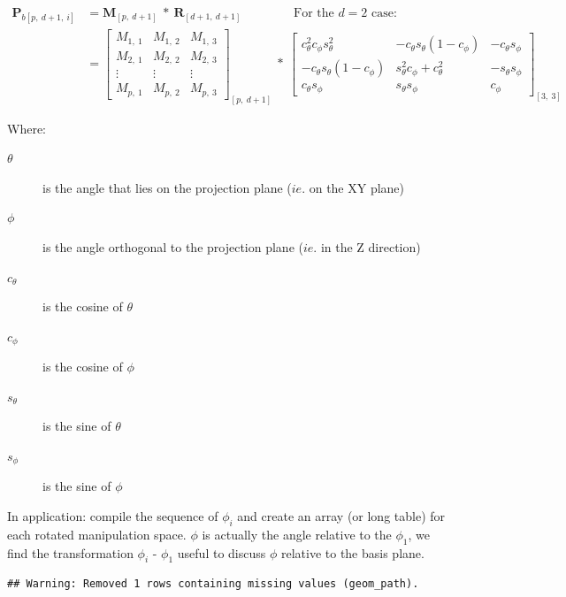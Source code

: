 \documentclass{monashthesis}
\begin{document}
\begin{align*}
  \textbf{P}_{b[p,~d+1,~i]}
  &= \textbf{M}_{[p,~d+1]} ~*~ \textbf{R}_{[d+1,~d+1]} 
    ~~~~~~~~~~~~~~~~~~~\text{For the $d=2$ case:} \\
  &= \begin{bmatrix}
    M_{1,~1} & M_{1,~2} & M_{1,~3} \\
    M_{2,~1} & M_{2,~2} & M_{2,~3} \\
    \vdots   & \vdots   & \vdots   \\
    M_{p,~1} & M_{p,~2} & M_{p,~3}
  \end{bmatrix}_{[p,~d+1]}
    ~*~
  \begin{bmatrix}
    c_\theta^2 c_\phi s_\theta^2 &
    -c_\theta s_\theta (1 - c_\phi) &
    -c_\theta s_\phi \\
    -c_\theta s_\theta (1 - c_\phi) &
    s_\theta^2 c_\phi + c_\theta^2 &
    -s_\theta s_\phi \\
    c_\theta s_\phi &
    s_\theta s_\phi &
    c_\phi
  \end{bmatrix}_{[3,~3]}
\end{align*}

Where:

\begin{description}
  \item[$\theta$] is the angle that lies on the projection plane ($ie.$ on the XY plane)
  \item[$\phi$] is the angle orthogonal to the projection plane ($ie.$ in the Z direction)
  \item[$c_\theta$] is the cosine of $\theta$
  \item[$c_\phi$]   is the cosine of $\phi$
  \item[$s_\theta$] is the sine of   $\theta$
  \item[$s_\phi$]   is the sine of   $\phi$
\end{description}

In application: compile the sequence of \(\phi_i\) and create an array (or long table) for each rotated manipulation space. \(\phi\) is actually the angle relative to the \(\phi_1\), we find the transformation \(\phi_i\) - \(\phi_1\) useful to discuss \(\phi\) relative to the basis plane.

\begin{verbatim}
## Warning: Removed 1 rows containing missing values (geom_path).
\end{verbatim}
\end{document}
